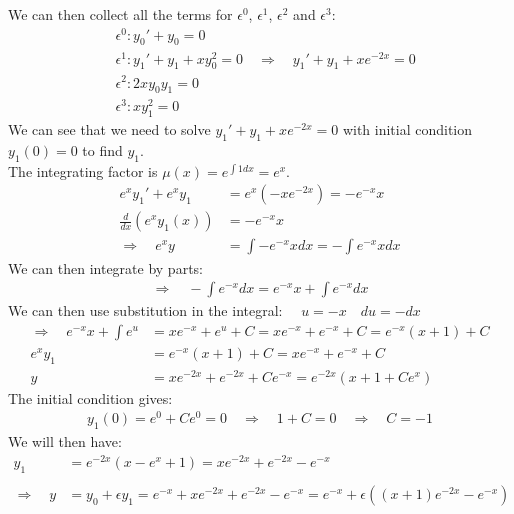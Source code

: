 \documentclass[english,a4paper,12pt]{article}
\begin{document}
We can then collect all the terms for $\epsilon^0$, $\epsilon^1$, $\epsilon^2$ and $\epsilon^3$:
\begin{align*}
&\epsilon^0 : y_0' + y_0 = 0\\
&\epsilon^1 : y_1' + y_1 + xy_0^2 = 0 \quad \Rightarrow \quad y_1' + y_1 + xe^{-2x} = 0\\
&\epsilon^2 : 2x y_0 y_1 = 0\\
&\epsilon^3 : xy_1^2 = 0
\end{align*}
We can see that we need to solve $y_1' + y_1 + xe^{-2x} = 0$ with initial condition $y_1(0) = 0$ to find $y_1$.\\
The integrating factor is $\mu(x) = e^{\int 1 dx} = e^x$.
\begin{align*}
e^x y_1' + e^x y_1 &= e^x (-xe^{-2x}) = -e^{-x}x\\
\frac{d}{dx}(e^x y_1(x)) &= -e^{-x}x\\
\Rightarrow \quad e^x y &= \int -e^{-x}x dx = - \int e^{-x}xdx
\end{align*}
We can then integrate by parts:\\
\begin{align*}
\Rightarrow \quad -\int e^{-x} dx = e^{-x}x + \int e^{-x} dx
\end{align*}
We can then use substitution in the integral: $\quad u = -x \quad du = -dx$
\begin{align*}
\Rightarrow \quad e^{-x}x + \int e^u &= xe^{-x} + e^u + C = xe^{-x} + e^{-x} + C = e^{-x} (x+1) + C\\
e^x y_1 &= e^{-x}(x+1) + C = xe^{-x} + e^{-x} + C\\
y &= x e^{-2x} + e^{-2x} + Ce^{-x} = e^{-2x}(x+1+Ce^x)
\end{align*}
The initial condition gives:\\
\begin{align*}
y_1(0) = e^0 + C e^0 = 0 \quad \Rightarrow \quad 1+C = 0 \quad \Rightarrow \quad C=-1
\end{align*}
We will then have:\\

\begin{align*}
y_1 &= e^{-2x}(x - e^x +1) = x e^{-2x} + e^{-2x} - e^{-x}\\\\
\Rightarrow \quad y &= y_0 + \epsilon y_1 = e^{-x} + x e^{-2x} + e^{-2x} - e^{-x} = e^{-x} + \epsilon((x+1)e^{-2x} - e^{-x})
\end{align*}
\end{document}
